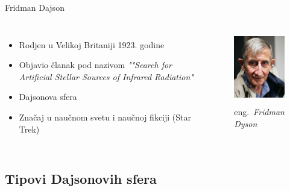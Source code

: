\documentclass[13pt]{beamer}
\begin{document}
\begin{frame}{Fridman Dajson}


\begin{columns}
    \begin{itemize}
        \item Rodjen u Velikoj Britaniji 1923. godine
        \item Objavio članak pod nazivom \textit{""Search for Artificial Stellar Sources of Infrared Radiation"}
        \item Dajsonova sfera
        \item Značaj u naučnom svetu i naučnoj fikciji (Star Trek)
        \end{itemize}
        \begin{figure}
            \centering
            \includegraphics[width=3.5cm, height=3.2cm]{images/fridman dajson.png}
            \caption{eng.~{\em Fridman Dyson}}
        \end{figure}
\end{columns}


\end{frame}


\subsection{Tipovi Dajsonovih sfera}
\end{document}
